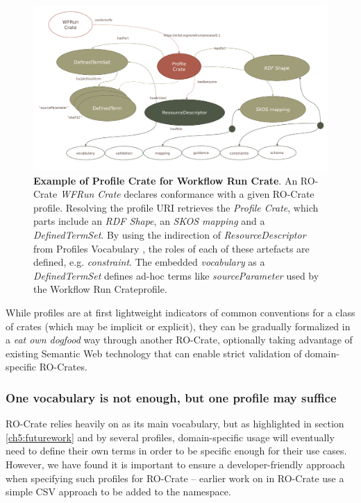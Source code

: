 \begin{figure}[htb]
    \includegraphics[width=\textwidth]{figures/ch09/profile-crate.pdf}
      \caption[Example of Profile Crate]{\textbf{Example of Profile Crate for Workflow Run Crate}. 
      An RO-Crate \emph{WFRun Crate} declares conformance with a given RO-Crate profile. 
      Resolving the profile URI retrieves the \emph{Profile Crate}, which parts include an \emph{RDF Shape}, an \emph{SKOS mapping} and a \emph{DefinedTermSet}. 
      By using the indirection of \emph{ResourceDescriptor} from Profiles Vocabulary \cite{dx-prof}, the roles of each of these artefacts are defined, e.g. \emph{constraint}. 
      The embedded \emph{vocabulary} as a \emph{DefinedTermSet} defines ad-hoc terms like \emph{sourceParameter} used by the Workflow Run Crate\footnotemark profile.
      }
    \label{ch9:fig:profilecrate}
  \end{figure}

While profiles are at first lightweight indicators of common conventions for a class of crates (which may be implicit or explicit), they can be gradually formalized in a \emph{eat own dogfood} way through another RO-Crate, optionally taking advantage of existing Semantic Web technology that can enable strict validation of domain-specific RO-Crates.


\subsubsection{One vocabulary is not enough, but one profile may suffice}

RO-Crate relies heavily on \cite{schema.org} as its main vocabulary, but as highlighted in section \vref{ch5:futurework} and by several profiles, domain-specific usage will eventually need to define their own terms in order to be specific enough for their use cases. However, we have found it is important to ensure a developer-friendly approach when specifying such profiles for RO-Crate -- earlier work on  in RO-Crate use a simple CSV approach to be added to the  namespace.  

